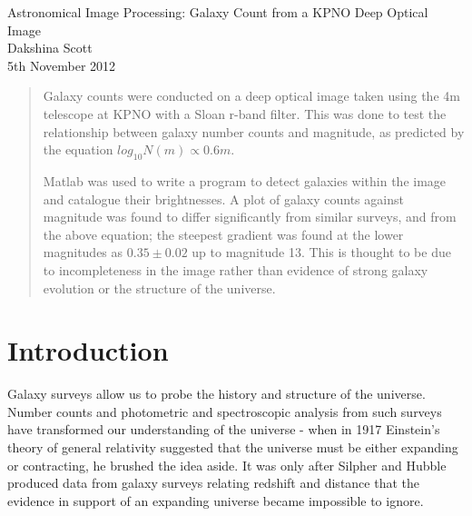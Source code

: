 \documentclass[a4paper,11pt,twoside]{article}
\begin{document}
\begin{titlepage}
\begin{center}

Astronomical Image Processing: Galaxy Count from a KPNO Deep Optical 
Image \\[8cm]
Dakshina Scott \\[4cm]
5th November 2012 \\

\end{center}
\end{titlepage}



\begin{abstract}

Galaxy counts were conducted on a deep optical image taken using the 
4m telescope at KPNO with a Sloan r-band filter. This was done to 
test the relationship between galaxy number counts and magnitude, 
as predicted by the equation \(log_{10} N(m) \propto 0.6m\).


Matlab was used to write a program to detect galaxies within the 
image and catalogue their brightnesses. A plot of galaxy counts 
against magnitude was found to differ significantly from similar 
surveys, and from the above equation; the steepest gradient was 
found at the lower magnitudes as \(0.35 \pm 0.02\) up to magnitude 
13. This is thought to be due to incompleteness in the image rather 
than evidence of strong galaxy evolution or the structure of 
the universe.

\end{abstract}


\tableofcontents


\section{Introduction}

Galaxy surveys allow us to probe the history and structure of the 
universe. Number counts and photometric and spectroscopic analysis 
from such surveys have transformed our understanding of the universe - 
when in 1917 Einstein's theory of general relativity suggested that 
the universe must be either expanding or contracting, he brushed the 
idea aside. It was only after Silpher and Hubble produced data from 
galaxy surveys relating redshift and distance that the evidence in 
support of an expanding universe became impossible to ignore\cite{raine}.
\end{document}
